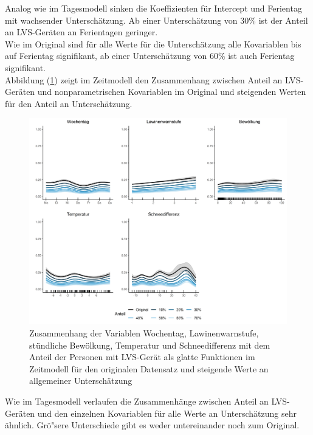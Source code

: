 \documentclass[12pt]{scrreprt}
\begin{document}
\noindent Analog wie im Tagesmodell sinken die Koeffizienten für Intercept und Ferientag mit wachsender Unterschätzung. Ab einer Unterschätzung von 30\% ist der Anteil an LVS-Geräten an Ferientagen geringer. \\
Wie im Original sind für alle Werte für die Unterschätzung alle Kovariablen bis auf Ferientag signifikant, ab einer Unterschätzung von 60\% ist auch Ferientag signifikant. \\
Abbildung (\ref{pic:time_model_general_comparison}) zeigt im Zeitmodell den Zusammenhang zwischen Anteil an LVS-Geräten und nonparametrischen Kovariablen im Original und steigenden Werten für den Anteil an Unterschätzung.
\begin{figure}[H]
	\centering
	\includegraphics[width=\linewidth]{plots/time_model_general_comparison}
	\caption{Zusammenhang der Variablen Wochentag, Lawinenwarnstufe, stündliche Bewölkung, Temperatur und Schneedifferenz mit dem Anteil der Personen mit LVS-Gerät als glatte Funktionen im Zeitmodell für den originalen Datensatz und steigende Werte an allgemeiner Unterschätzung}
	\label{pic:time_model_general_comparison}	
\end{figure}
\noindent Wie im Tagesmodell verlaufen die Zusammenhänge zwischen Anteil an LVS-Geräten und den einzelnen Kovariablen für alle Werte an Unterschätzung sehr ähnlich. Grö"sere Unterschiede gibt es weder untereinander noch zum Original.
\end{document}
